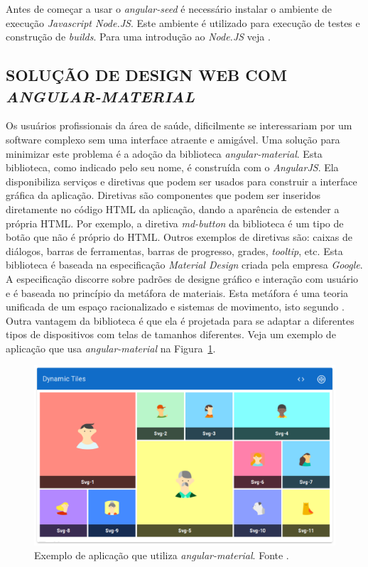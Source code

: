 Antes de começar a usar o \emph{angular-seed} é necessário instalar o ambiente de execução \emph{Javascript Node.JS}. 
Este ambiente é utilizado para execução de testes e construção de \emph{builds}. Para uma introdução ao \emph{Node.JS} veja .
\subsection{SOLUÇÃO DE DESIGN WEB COM \emph{ANGULAR-MATERIAL}}
\label{angular_material}

Os usuários profissionais da área de saúde, dificilmente se interessariam por um software complexo sem uma interface atraente e amigável.
Uma solução para minimizar este problema é a adoção da  biblioteca \emph{angular-material}. 
Esta biblioteca, como indicado pelo seu nome, é construída com o \emph{AngularJS}. 
Ela disponibiliza serviços e diretivas que podem ser usados para construir a interface gráfica da aplicação. 
Diretivas são componentes que podem ser inseridos diretamente no código HTML da aplicação, dando a aparência de estender a própria HTML. 
Por exemplo, a diretiva \emph{md-button} da biblioteca é um tipo de botão que não é próprio do HTML. 
Outros exemplos de diretivas são: caixas de diálogos, barras de ferramentas, barras de progresso, grades, \emph{tooltip}, etc. 
Esta biblioteca é baseada na especificação \emph{Material Design} criada pela empresa \emph{Google}. 
A especificação discorre sobre padrões de designe gráfico e interação com usuário e é baseada no princípio da metáfora de materiais. 
Esta metáfora é uma teoria unificada de um espaço racionalizado e sistemas de movimento, isto segundo . 
Outra vantagem da biblioteca é que ela é projetada para se adaptar a diferentes tipos de dispositivos com telas de tamanhos diferentes.
Veja um exemplo de aplicação que usa \emph{angular-material} na Figura~\ref{material_1}.


\begin{figure}[ht]
	\centering
	\includegraphics[width=14cm]{figuras/material.eps}
	\caption{Exemplo de aplicação que utiliza \emph{angular-material}. Fonte \cite{Google2015c}.}
	\label{material_1}
\end{figure}



